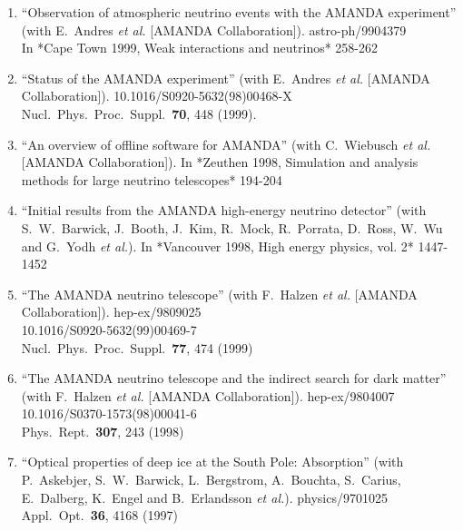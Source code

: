 \begin{enumerate}
\item ``Observation of atmospheric neutrino events with the AMANDA experiment'' (with E.~Andres {\it et al.}  [AMANDA Collaboration]). astro-ph/9904379
  \\{}In *Cape Town 1999, Weak interactions and neutrinos* 258-262 %


\item ``Status of the AMANDA experiment'' (with E.~Andres {\it et al.}  [AMANDA Collaboration]). 10.1016/S0920-5632(98)00468-X
\\{}Nucl.\ Phys.\ Proc.\ Suppl.\  {\bf 70}, 448 (1999). %


\item ``An overview of offline software for AMANDA'' (with C.~Wiebusch {\it et al.} [AMANDA Collaboration]). In *Zeuthen 1998, Simulation and analysis methods for large neutrino telescopes* 194-204 %


\item ``Initial results from the AMANDA high-energy neutrino detector'' (with S.~W.~Barwick, J.~Booth, J.~Kim, R.~Mock, R.~Porrata, D.~Ross, W.~Wu and G.~Yodh {\it et al.}). In *Vancouver 1998, High energy physics, vol. 2* 1447-1452 %


\item ``The AMANDA neutrino telescope'' (with F.~Halzen {\it et al.}  [AMANDA Collaboration]). hep-ex/9809025
    \\{}10.1016/S0920-5632(99)00469-7
\\{}Nucl.\ Phys.\ Proc.\ Suppl.\  {\bf 77}, 474 (1999) %


\item ``The AMANDA neutrino telescope and the indirect search for dark matter'' (with F.~Halzen {\it et al.}  [AMANDA Collaboration]). hep-ex/9804007
    \\{}10.1016/S0370-1573(98)00041-6
\\{}Phys.\ Rept.\  {\bf 307}, 243 (1998) %


\item ``Optical properties of deep ice at the South Pole: Absorption'' (with P.~Askebjer, S.~W.~Barwick, L.~Bergstrom, A.~Bouchta, S.~Carius, E.~Dalberg, K.~Engel and B.~Erlandsson {\it et al.}). physics/9701025
\\{}Appl.\ Opt.\  {\bf 36}, 4168 (1997) %



\end{enumerate}
